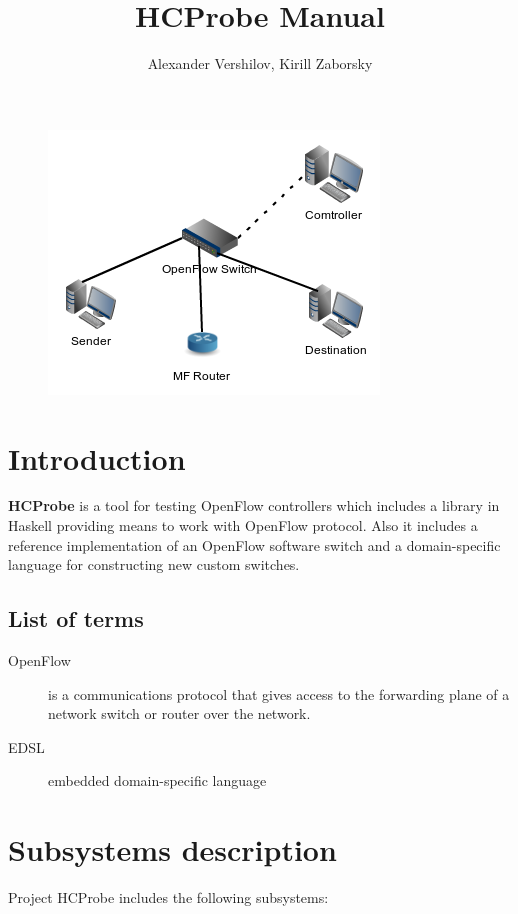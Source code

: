 \documentclass[9pt,a4paper]{article}
\title{HCProbe Manual}
\author{Alexander Vershilov, Kirill Zaborsky}
\begin{document}
\maketitle
\begin{figure}[!h]
   \centering 
   \includegraphics[width=0.3\columnwidth]{images/testcfg2.png}
\end{figure}                                                        

\tableofcontents

\pagebreak

\section{Introduction}

\textbf{HCProbe} is a tool for testing OpenFlow controllers which
includes a library in Haskell providing means to work with OpenFlow
protocol. Also it includes a reference implementation of an OpenFlow
software switch and a domain-specific language for constructing new
custom switches.

\subsection{List of terms}

\begin{description}
  \item[OpenFlow] is a communications protocol that gives access to
    the forwarding plane of a network switch or router over the
    network.
  \item[EDSL] embedded domain-specific language
\end{description}

\pagebreak

\section{Subsystems description}

Project HCProbe includes the following subsystems:
\end{document}

